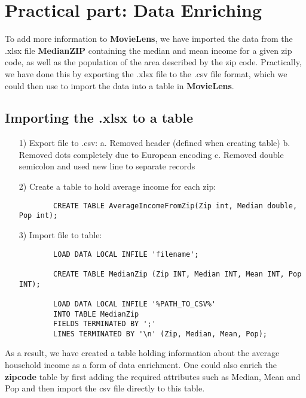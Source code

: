 \section{Practical part: Data Enriching}
To add more information to \textbf{MovieLens}, we have imported the data from the .xlsx file \textbf{MedianZIP} containing the median and mean income for a given zip code, as well as the population of the area described by the zip code. Practically, we have done this by exporting the .xlsx file to the .csv file format, which we could then use to import the data into a table in \textbf{MovieLens}.

\subsection{Importing the .xlsx to a table}
\begin{itemize}
	
	\item [1)]Export file to .csv:
	\subitem a. Removed header (defined when creating table)
	\subitem b. Removed dots completely due to European encoding
	\subitem c. Removed double semicolon and used new line to separate records 
	
	\item[2)]Create a table to hold average income for each zip:
	\begin{verbatim}
		CREATE TABLE AverageIncomeFromZip(Zip int, Median double, Pop int);
	\end{verbatim}
	
	\item [3)]Import file to table:
	\begin{verbatim}
		LOAD DATA LOCAL INFILE 'filename';

		CREATE TABLE MedianZip (Zip INT, Median INT, Mean INT, Pop INT);

		LOAD DATA LOCAL INFILE '%PATH_TO_CSV%' 
		INTO TABLE MedianZip 
		FIELDS TERMINATED BY ';' 
		LINES TERMINATED BY '\n' (Zip, Median, Mean, Pop);
	\end{verbatim}
		
\end{itemize}

\noindent As a result, we have created a table holding information about the average household income as a form of data enrichment. One could also enrich the \textbf{zipcode} table by first adding the required attributes such as Median, Mean and Pop and then import the csv file directly to this table.

\newpage